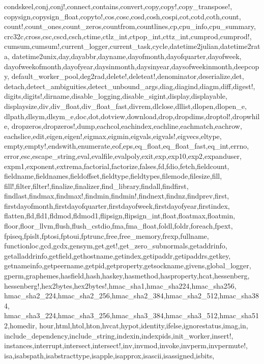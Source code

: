{{condskeel,conj,conj!,connect,contains,convert,copy,copy!,copy_transpose!,%
copysign,copysign_float,copyto!,cos,cosc,cosd,cosh,cospi,cot,cotd,coth,count,%
count!,count_ones,count_zeros,countfrom,countlines,cp,cpu_info,cpu_summary,%
crc32c,cross,csc,cscd,csch,ctime,ctlz_int,ctpop_int,cttz_int,cumprod,cumprod!,%
cumsum,cumsum!,current_logger,current_task,cycle,datetime2julian,datetime2rata,%
datetime2unix,day,dayabbr,dayname,dayofmonth,dayofquarter,dayofweek,%
dayofweekofmonth,dayofyear,daysinmonth,daysinyear,daysofweekinmonth,deepcopy,%
default_worker_pool,deg2rad,delete!,deleteat!,denominator,deserialize,det,%
detach,detect_ambiguities,detect_unbound_args,diag,diagind,diagm,diff,digest!,%
digits,digits!,dirname,disable_logging,disable_sigint,display,displayable,%
displaysize,div,div_float,div_float_fast,divrem,dlclose,dllist,dlopen,dlopen_e,%
dlpath,dlsym,dlsym_e,doc,dot,dotview,download,drop,dropdims,droptol!,dropwhile,%
dropzeros,dropzeros!,dump,eachcol,eachindex,eachline,eachmatch,eachrow,%
eachslice,edit,eigen,eigen!,eigmax,eigmin,eigvals,eigvals!,eigvecs,eltype,%
empty,empty!,endswith,enumerate,eof,eps,eq_float,eq_float_fast,eq_int,errno,%
error,esc,escape_string,eval,evalfile,evalpoly,exit,exp,exp10,exp2,expanduser,%
expm1,exponent,extrema,factorial,factorize,falses,fd,fdio,fetch,fieldcount,%
fieldname,fieldnames,fieldoffset,fieldtype,fieldtypes,filemode,filesize,fill,%
fill!,filter,filter!,finalize,finalizer,find_library,findall,findfirst,%
findlast,findmax,findmax!,findmin,findmin!,findnext,findnz,findprev,first,%
firstdayofmonth,firstdayofquarter,firstdayofweek,firstdayofyear,firstindex,%
flatten,fld,fld1,fldmod,fldmod1,flipsign,flipsign_int,float,floatmax,floatmin,%
floor,floor_llvm,flush,flush_cstdio,fma,fma_float,foldl,foldr,foreach,fpext,%
fpiseq,fpislt,fptosi,fptoui,fptrunc,free,free_memory,frexp,fullname,%
functionloc,gcd,gcdx,gensym,get,get!,get_zero_subnormals,getaddrinfo,%
getalladdrinfo,getfield,gethostname,getindex,getipaddr,getipaddrs,getkey,%
getnameinfo,getpeername,getpid,getproperty,getsockname,givens,global_logger,%
gperm,graphemes,hasfield,hash,haskey,hasmethod,hasproperty,hcat,hessenberg,%
hessenberg!,hex2bytes,hex2bytes!,hmac_sha1,hmac_sha224,hmac_sha256,%
hmac_sha2_224,hmac_sha2_256,hmac_sha2_384,hmac_sha2_512,hmac_sha384,%
hmac_sha3_224,hmac_sha3_256,hmac_sha3_384,hmac_sha3_512,hmac_sha512,homedir,%
hour,html,htol,hton,hvcat,hypot,identity,ifelse,ignorestatus,imag,in,%
include_dependency,include_string,indexin,indexpids,init_worker,insert!,%
instances,interrupt,intersect,intersect!,inv,invmod,invoke,invperm,invpermute!,%
isa,isabspath,isabstracttype,isapple,isapprox,isascii,isassigned,isbits,%
}}
